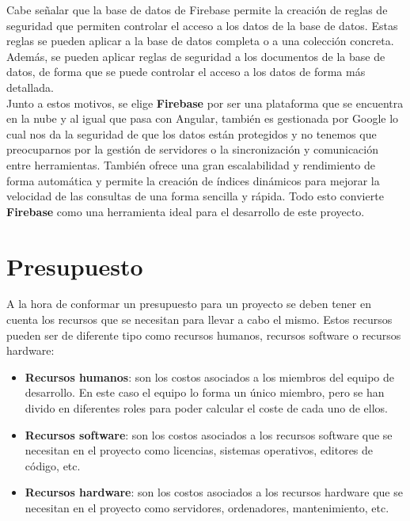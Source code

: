 Cabe señalar que la base de datos de Firebase permite la creación de reglas de seguridad que permiten controlar
el acceso a los datos de la base de datos. Estas reglas se pueden aplicar a la base de datos completa o a una
colección concreta. Además, se pueden aplicar reglas de seguridad a los documentos de la base de datos, de forma
que se puede controlar el acceso a los datos de forma más detallada. \\

Junto a estos motivos, se elige \textbf{Firebase} por ser una plataforma que se encuentra en la nube y al igual que pasa con Angular,
también es gestionada por Google lo cual nos da la seguridad de que los datos están protegidos y no tenemos que preocuparnos por la
gestión de servidores o la sincronización y comunicación entre herramientas. También ofrece una gran escalabilidad y
rendimiento de forma automática y permite la creación de índices dinámicos para mejorar la velocidad de las consultas
de una forma sencilla y rápida. Todo esto convierte \textbf{Firebase} como una herramienta ideal para el desarrollo
de este proyecto.

\section{Presupuesto}\label{sec:presupuesto}

A la hora de conformar un presupuesto para un proyecto se deben tener en cuenta los recursos que se necesitan para
llevar a cabo el mismo. Estos recursos pueden ser de diferente tipo como recursos humanos, recursos software o
recursos hardware:

\begin{itemize}
    \item \textbf{Recursos humanos}: son los costos asociados a los miembros del equipo de desarrollo. En este caso
    el equipo lo forma un único miembro, pero se han divido en diferentes roles para poder calcular el coste
    de cada uno de ellos.
    \item \textbf{Recursos software}: son los costos asociados a los recursos software que se necesitan en el proyecto
    como licencias, sistemas operativos, editores de código, etc.
    \item \textbf{Recursos hardware}: son los costos asociados a los recursos hardware que se necesitan en el proyecto
    como servidores, ordenadores, mantenimiento, etc.
\end{itemize}

\newpage

